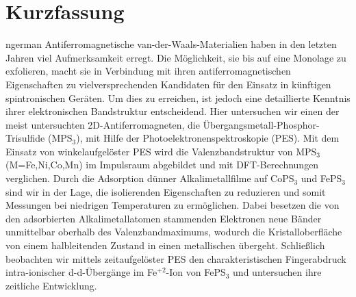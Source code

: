 \section*{Kurzfassung}
\begin{foreignlanguage}{ngerman}
    Antiferromagnetische van-der-Waals-Materialien haben in den letzten Jahren viel Aufmerksamkeit erregt.
    Die Möglichkeit, sie bis auf eine Monolage zu exfolieren, macht sie in Verbindung mit ihren antiferromagnetischen Eigenschaften zu vielversprechenden Kandidaten für den Einsatz in künftigen spintronischen Geräten. Um dies zu erreichen, ist jedoch eine detaillierte Kenntnis ihrer elektronischen Bandstruktur entscheidend. Hier untersuchen wir einen der meist untersuchten 2D-Antiferromagneten, die Übergangsmetall-Phosphor-Trisulfide (MPS$_\text{3}$), mit Hilfe der Photoelektronenspektroskopie (PES). 
    Mit dem Einsatz von winkelaufgelöster PES wird die Valenzbandstruktur von MPS$_\text{3}$ (M=Fe,Ni,Co,Mn) im Impulsraum abgebildet und mit DFT-Berechnungen verglichen.
    Durch die Adsorption dünner Alkalimetallfilme auf CoPS$_\text{3}$ und FePS$_\text{3}$ sind wir in der Lage, die isolierenden Eigenschaften zu reduzieren und somit Messungen bei niedrigen Temperaturen zu ermöglichen.
    Dabei besetzen die von den adsorbierten Alkalimetallatomen stammenden Elektronen neue Bänder unmittelbar oberhalb des Valenzbandmaximums, wodurch die Kristalloberfläche von einem halbleitenden Zustand in einen metallischen übergeht.
    Schließlich beobachten wir mittels zeitaufgelöster PES den charakteristischen Fingerabdruck intra-ionischer d-d-Übergänge im Fe$^{+2}$-Ion von FePS$_\text{3}$ und untersuchen ihre zeitliche Entwicklung.
\end{foreignlanguage}